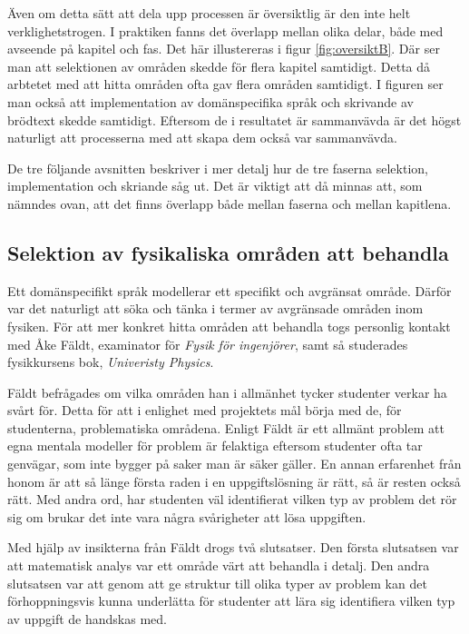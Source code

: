 \begin{binge}
Även om detta sätt att dela upp processen är översiktlig är den inte helt verklighetstrogen. I praktiken fanns det överlapp mellan olika delar, både med avseende på kapitel och fas. Det här illustereras i figur \ref{fig:oversiktB}. Där ser man att selektionen av områden skedde för flera kapitel samtidigt. Detta då arbtetet med att hitta områden ofta gav flera områden samtidigt. I figuren ser man också att implementation av domänspecifika språk och skrivande av brödtext skedde samtidigt. Eftersom de i resultatet är sammanvävda är det högst naturligt att processerna med att skapa dem också var sammanvävda.

De tre följande avsnitten beskriver i mer detalj hur de tre faserna selektion, implementation och skriande såg ut. Det är viktigt att då minnas att, som nämndes ovan, att det finns överlapp både mellan faserna och mellan kapitlena.

\subsection{Selektion av fysikaliska områden att behandla}
\label{sec:selektion}

Ett domänspecifikt språk modellerar ett specifikt och avgränsat område. Därför var det naturligt att söka och tänka i termer av avgränsade områden inom fysiken. För att mer konkret hitta områden att behandla togs personlig kontakt med Åke Fäldt, examinator för \textit{Fysik för ingenjörer}, samt så studerades fysikkursens bok, \textit{Univeristy Physics}.

Fäldt befrågades om vilka områden han i allmänhet tycker studenter verkar ha svårt för. Detta för att i enlighet med projektets mål börja med de, för studenterna, problematiska områdena. Enligt Fäldt är ett allmänt problem att egna mentala modeller för problem är felaktiga eftersom studenter ofta tar genvägar, som inte bygger på saker man är säker gäller. En annan erfarenhet från honom är att så länge första raden i en uppgiftslösning är rätt, så är resten också rätt. Med andra ord, har studenten väl identifierat vilken typ av problem det rör sig om brukar det inte vara några svårigheter att lösa uppgiften.

Med hjälp av insikterna från Fäldt drogs två slutsatser. Den första slutsatsen var att matematisk analys var ett område värt att behandla i detalj. Den andra slutsatsen var att genom att ge struktur till olika typer av problem kan det förhoppningsvis kunna underlätta för studenter att lära sig identifiera vilken typ av uppgift de handskas med.


\end{binge}
